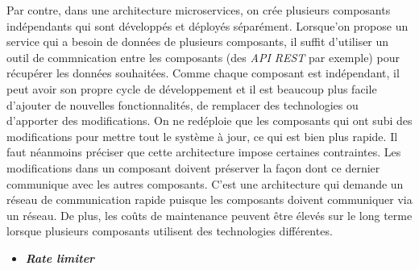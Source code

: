 \vspace{3mm}

Par contre, dans une architecture microservices, on crée plusieurs composants indépendants qui sont développés et déployés séparément. Lorsque'on propose un service qui a besoin de données de plusieurs composants, il suffit d'utiliser un outil de commnication entre les composants (des \textit{API REST} par exemple) pour récupérer les données souhaitées. Comme chaque composant est indépendant, il peut avoir son propre cycle de développement et il est beaucoup plus facile d'ajouter de nouvelles fonctionnalités, de remplacer des technologies ou d'apporter des modifications. On ne redéploie que les composants qui ont subi des modifications pour mettre tout le système à jour, ce qui est bien plus rapide. Il faut néanmoins préciser que cette architecture impose certaines contraintes. Les modifications dans un composant doivent préserver la façon dont ce dernier communique avec les autres composants. C'est une architecture qui demande un réseau de communication rapide puisque les composants doivent communiquer via un réseau. De plus, les coûts de maintenance peuvent être élevés sur le long terme lorsque plusieurs composants utilisent des technologies différentes.

\vspace{3mm}


\begin{itemize}[font=\color{blue}, label=]
  \item \textbf{  \textit{Rate limiter}}
\end{itemize}

\vspace{3mm}


